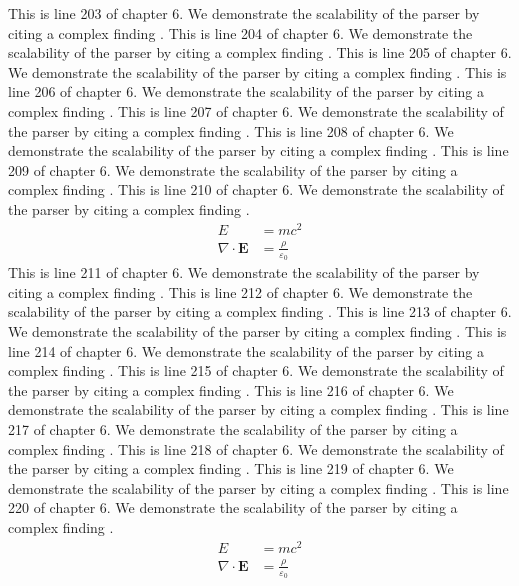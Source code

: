 This is line 203 of chapter 6. We demonstrate the scalability of the parser by citing a complex finding \cite{ref6_203}.
This is line 204 of chapter 6. We demonstrate the scalability of the parser by citing a complex finding \cite{ref6_204}.
This is line 205 of chapter 6. We demonstrate the scalability of the parser by citing a complex finding \cite{ref6_205}.
This is line 206 of chapter 6. We demonstrate the scalability of the parser by citing a complex finding \cite{ref6_206}.
This is line 207 of chapter 6. We demonstrate the scalability of the parser by citing a complex finding \cite{ref6_207}.
This is line 208 of chapter 6. We demonstrate the scalability of the parser by citing a complex finding \cite{ref6_208}.
This is line 209 of chapter 6. We demonstrate the scalability of the parser by citing a complex finding \cite{ref6_209}.
This is line 210 of chapter 6. We demonstrate the scalability of the parser by citing a complex finding \cite{ref6_210}.
\begin{align*}
  E &= mc^2 \\
  \nabla \cdot \mathbf{E} &= \frac{\rho}{\varepsilon_0}
\end{align*}
This is line 211 of chapter 6. We demonstrate the scalability of the parser by citing a complex finding \cite{ref6_211}.
This is line 212 of chapter 6. We demonstrate the scalability of the parser by citing a complex finding \cite{ref6_212}.
This is line 213 of chapter 6. We demonstrate the scalability of the parser by citing a complex finding \cite{ref6_213}.
This is line 214 of chapter 6. We demonstrate the scalability of the parser by citing a complex finding \cite{ref6_214}.
This is line 215 of chapter 6. We demonstrate the scalability of the parser by citing a complex finding \cite{ref6_215}.
This is line 216 of chapter 6. We demonstrate the scalability of the parser by citing a complex finding \cite{ref6_216}.
This is line 217 of chapter 6. We demonstrate the scalability of the parser by citing a complex finding \cite{ref6_217}.
This is line 218 of chapter 6. We demonstrate the scalability of the parser by citing a complex finding \cite{ref6_218}.
This is line 219 of chapter 6. We demonstrate the scalability of the parser by citing a complex finding \cite{ref6_219}.
This is line 220 of chapter 6. We demonstrate the scalability of the parser by citing a complex finding \cite{ref6_220}.
\begin{align*}
  E &= mc^2 \\
  \nabla \cdot \mathbf{E} &= \frac{\rho}{\varepsilon_0}
\end{align*}
